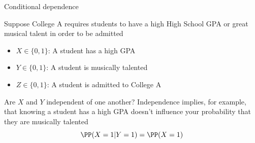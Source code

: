 \documentclass[compress, 8pt]{beamer}
\begin{document}



\begin{frame}{Conditional dependence}

Suppose College A requires students to have a high High School GPA or great musical talent in order to be admitted
\begin{itemize}
    \item $X \in \{0, 1\}$: A student has a high GPA
    \item $Y \in \{0, 1\}$: A student is musically talented
    \item $Z \in \{0, 1\}$: A student is admitted to College A
\end{itemize}
\begin{figure}
\end{figure}

Are $X$ and $Y$ independent of one another? Independence implies, for example, that knowing a student has a high GPA doesn't influence your probability that they are musically talented
    \begin{equation*}
    \PP (X =1 \vert Y=1) = \PP (X=1)
    \end{equation*}
 
\end{frame}
\end{document}
